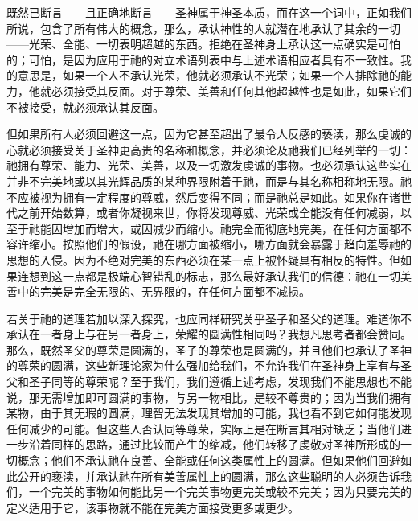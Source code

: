 既然已断言——且正确地断言——圣神属于神圣本质，而在这一个词中，正如我们所说，包含了所有伟大的概念，那么，承认神性的人就潜在地承认了其余的一切——光荣、全能、一切表明超越的东西。拒绝在圣神身上承认这一点确实是可怕的；可怕，是因为应用于祂的对立术语列表中与上述术语相应者具有不一致性。我的意思是，如果一个人不承认光荣，他就必须承认不光荣；如果一个人排除祂的能力，他就必须接受其反面。对于尊荣、美善和任何其他超越性也是如此，如果它们不被接受，就必须承认其反面。\par

但如果所有人必须回避这一点，因为它甚至超出了最令人反感的亵渎，那么虔诚的心就必须接受关于圣神更高贵的名称和概念，并必须论及祂我们已经列举的一切：祂拥有尊荣、能力、光荣、美善，以及一切激发虔诚的事物。也必须承认这些实在并非不完美地或以其光辉品质的某种界限附着于祂，而是与其名称相称地无限。祂不应被视为拥有一定程度的尊威，然后变得不同；而是祂总是如此。如果你在诸世代之前开始数算，或者你凝视来世，你将发现尊威、光荣或全能没有任何减弱，以至于祂能因增加而增大，或因减少而缩小。祂完全而彻底地完美，在任何方面都不容许缩小。按照他们的假设，祂在哪方面被缩小，哪方面就会暴露于趋向羞辱祂的思想的入侵。因为不绝对完美的东西必须在某一点上被怀疑具有相反的特性。但如果连想到这一点都是极端心智错乱的标志，那么最好承认我们的信德：祂在一切美善中的完美是完全无限的、无界限的，在任何方面都不减损。\par

若关于祂的道理若加以深入探究，也应同样研究关乎圣子和圣父的道理。难道你不承认在一者身上与在另一者身上，荣耀的圆满性相同吗？我想凡思考者都会赞同。那么，既然圣父的尊荣是圆满的，圣子的尊荣也是圆满的，并且他们也承认了圣神的尊荣的圆满，这些新理论家为什么强加给我们，不允许我们在圣神身上享有与圣父和圣子同等的尊荣呢？至于我们，我们遵循上述考虑，发现我们不能思想也不能说，那无需增加即可圆满的事物，与另一物相比，是较不尊贵的；因为当我们拥有某物，由于其无瑕的圆满，理智无法发现其增加的可能，我也看不到它如何能发现任何减少的可能。但这些人否认同等尊荣，实际上是在断言其相对缺乏；当他们进一步沿着同样的思路，通过比较而产生的缩减，他们转移了虔敬对圣神所形成的一切概念；他们不承认祂在良善、全能或任何这类属性上的圆满。但如果他们回避如此公开的亵渎，并承认祂在所有美善属性上的圆满，那么这些聪明的人必须告诉我们，一个完美的事物如何能比另一个完美事物更完美或较不完美；因为只要完美的定义适用于它，该事物就不能在完美方面接受更多或更少。\par

